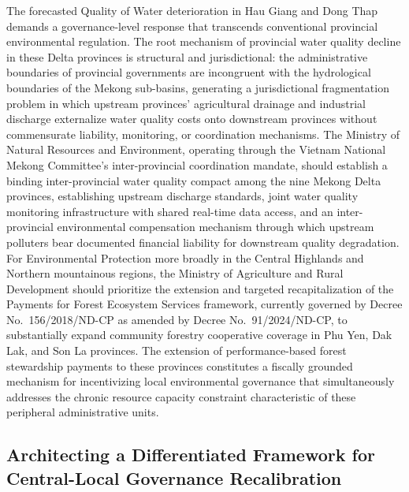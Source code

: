 \documentclass[12pt,a4paper]{article}
\begin{document}
The forecasted Quality of Water deterioration in Hau Giang and Dong Thap demands a governance-level response that transcends conventional provincial environmental regulation. The root mechanism of provincial water quality decline in these Delta provinces is structural and jurisdictional: the administrative boundaries of provincial governments are incongruent with the hydrological boundaries of the Mekong sub-basins, generating a jurisdictional fragmentation problem in which upstream provinces' agricultural drainage and industrial discharge externalize water quality costs onto downstream provinces without commensurate liability, monitoring, or coordination mechanisms. The Ministry of Natural Resources and Environment, operating through the Vietnam National Mekong Committee's inter-provincial coordination mandate, should establish a binding inter-provincial water quality compact among the nine Mekong Delta provinces, establishing upstream discharge standards, joint water quality monitoring infrastructure with shared real-time data access, and an inter-provincial environmental compensation mechanism through which upstream polluters bear documented financial liability for downstream quality degradation. For Environmental Protection more broadly in the Central Highlands and Northern mountainous regions, the Ministry of Agriculture and Rural Development should prioritize the extension and targeted recapitalization of the Payments for Forest Ecosystem Services framework, currently governed by Decree No.\ 156/2018/ND-CP as amended by Decree No.\ 91/2024/ND-CP, to substantially expand community forestry cooperative coverage in Phu Yen, Dak Lak, and Son La provinces. The extension of performance-based forest stewardship payments to these provinces constitutes a fiscally grounded mechanism for incentivizing local environmental governance that simultaneously addresses the chronic resource capacity constraint characteristic of these peripheral administrative units.

\subsection{Architecting a Differentiated Framework for Central-Local Governance Recalibration}
\label{subsec:policy_central_local}
\end{document}
